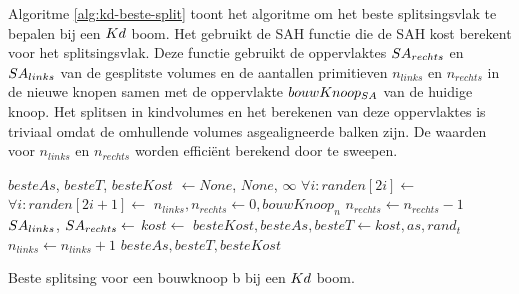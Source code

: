 Algoritme \ref{alg:kd-beste-split} toont het algoritme om het beste splitsingsvlak te bepalen bij een $Kd$ boom.
Het gebruikt de SAH functie die de SAH kost berekent voor het splitsingsvlak.
Deze functie gebruikt de oppervlaktes $SA_{rechts}$ en $SA_{links}$ van de gesplitste volumes en de aantallen primitieven $n_{links}$ en $n_{rechts}$ in de nieuwe knopen samen met de oppervlakte $bouwKnoop_{SA}$ van de huidige knoop.
Het splitsen in kindvolumes en het berekenen van deze oppervlaktes is triviaal omdat de omhullende volumes asgealigneerde balken zijn.
De waarden voor $n_{links}$ en $n_{rechts}$ worden efficiënt berekend door te sweepen.

\begin{dutchalgorithm}
    \begin{algorithmic}       
            \State $besteAs$, $besteT$, $besteKost$ $\gets None$, $None$, $\infty$
                \State $\forall i: randen[2i]\gets$ 
                \State $\forall i: randen[2i+1]\gets$ 
                \State {}
                \State $n_{links}, n_{rechts} \gets 0, bouwKnoop_n$
                        \State $n_{rechts} \gets n_{rechts} - 1$
                    \EndIf
                    \State $SA_{links}$, $SA_{rechts} \gets $ 
                    \State $kost \gets$ 
                        \State $besteKost, besteAs, besteT \gets kost, as, rand_t$
                    \EndIf
                        \State $n_{links} \gets n_{links} + 1$
                    \EndIf
                \EndFor                
            \EndFor
            \State \Return $besteAs, besteT, besteKost$
        \EndFunction
    \end{algorithmic}
    \caption{Beste splitsing voor een bouwknoop b bij een $Kd$ boom.}
    \label{alg:kd-beste-split}
\end{dutchalgorithm}



